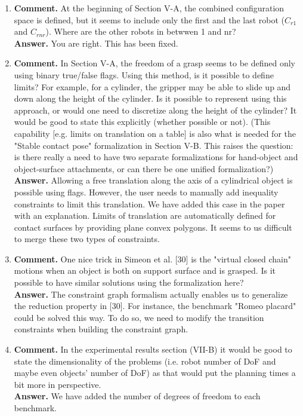 \documentclass{article}
\begin{document}
\begin{enumerate}
\item \textbf{Comment.} At the beginning of Section V-A, the combined
  configuration space is defined, but it seems to include only the
  first and the last robot ($C_{r1}$ and $C_{rnr}$). Where are the other
  robots in betwwen 1 and nr?\\ \textbf{Answer.} You are right. This has
  been fixed.

\item \textbf{Comment.} In Section V-A, the freedom of a grasp seems
  to be defined only using binary true/false flags. Using this method,
  is it possible to define limits? For example, for a cylinder, the
  gripper may be able to slide up and down along the height of the
  cylinder. Is it possible to represent using this approach, or would
  one need to discretize along the height of the cylinder? It would be
  good to state this explicitly (whether possible or not). (This
  capability [e.g. limits on translation on a table] is also what is
  needed for the "Stable contact pose" formalization in Section
  V-B. This raises the question: is there really a need to have two
  separate formalizations for hand-object and object-surface
  attachments, or can there be one unified
  formalization?)\\
  \textbf{Answer.} Allowing a free translation along the axis of a cylindrical
  object is possible using flags. However, the user needs to manually add
  inequality constraints to limit this translation. We have added this case in
  the paper with an explanation. Limits of translation are automatically
  defined for contact surfaces by providing plane convex polygons. It seems
  to us difficult to merge these two types of constraints.

\item \textbf{Comment.} One nice trick in Simeon et al. [30] is the
  "virtual closed chain" motions when an object is both on support
  surface and is grasped. Is it possible to have similar solutions
  using the formalization here?\\
  \textbf{Answer.} The constraint graph formalism actually enables us to
  generalize the reduction property in [30]. For instance, the benchmark
  "Romeo placard" could be solved this way. To do so, we need to modify the
  transition constraints when building the constraint graph.

\item \textbf{Comment.} In the experimental results section (VII-B) it
  would be good to state the dimensionality of the problems
  (i.e. robot number of DoF and maybe even objects' number of DoF) as
  that would put the planning times a bit more in
  perspective.\\
  \textbf{Answer.} We have added the number of degrees of freedom to each
  benchmark.
\end{enumerate}
\end{document}
